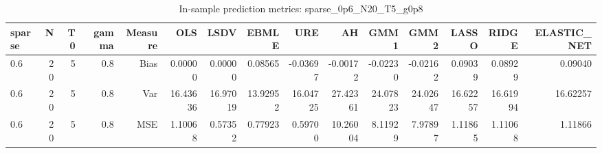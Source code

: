 \begin{table}[!htbp]\centering
\caption{In-sample prediction metrics: sparse_0p6_N20_T5_g0p8}
\label{tab:table2_sparse_0p6_N20_T5_g0p8}
\begin{tabular}{lrrrrrrrrrrrrrr}
\hline
sparse & N & T0 & gamma & Measure & OLS & LSDV & EBMLE & URE & AH & GMM1 & GMM2 & LASSO & RIDGE & ELASTIC_NET \\
\hline
0.6 & 20 & 5 & 0.8 & Bias & 0.00000 & 0.00000 & 0.08565 & -0.03697 & -0.00172 & -0.02230 & -0.02162 & 0.09039 & 0.08929 & 0.09040 \\
0.6 & 20 & 5 & 0.8 & Var & 16.43636 & 16.97019 & 13.92952 & 16.04725 & 27.42361 & 24.07823 & 24.02647 & 16.62257 & 16.61994 & 16.62257 \\
0.6 & 20 & 5 & 0.8 & MSE & 1.10068 & 0.57352 & 0.77923 & 0.59700 & 10.26004 & 8.11929 & 7.97897 & 1.11865 & 1.11068 & 1.11866 \\
\hline
\end{tabular}
\end{table}

